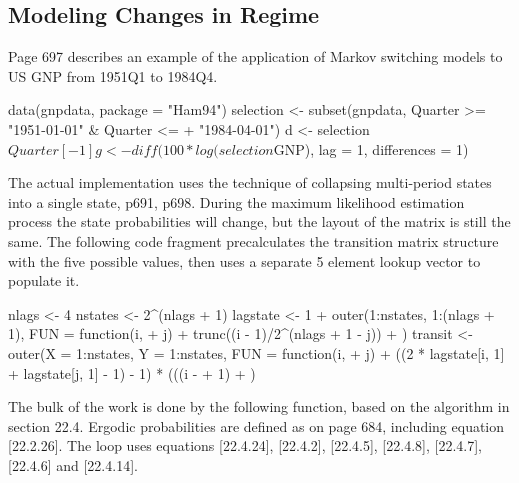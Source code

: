 \documentclass[a4paper]{article}
\renewcommand{\~}{\perispomeni}%
\begin{document}
\subsection{Modeling Changes in Regime}
Page 697 describes an example of the application of Markov switching models to US GNP from 1951Q1 to 1984Q4.
\begin{Schunk}
\begin{Sinput}
 data(gnpdata, package = "Ham94")
 selection <- subset(gnpdata, Quarter >= "1951-01-01" & Quarter <= 
+     "1984-04-01")
 d <- selection$Quarter[-1]
 g <- diff(100 * log(selection$GNP), lag = 1, differences = 1)
\end{Sinput}
\end{Schunk}

The actual implementation uses the technique of collapsing multi-period states into a single state, p691, p698.
During the maximum likelihood estimation process the state probabilities will change, but the layout of the matrix
is still the same.  The following code fragment precalculates the transition matrix structure with the five possible
values, then uses a separate 5 element lookup vector to populate it.
\begin{Schunk}
\begin{Sinput}
 nlags <- 4
 nstates <- 2^(nlags + 1)
 lagstate <- 1 + outer(1:nstates, 1:(nlags + 1), FUN = function(i, 
+     j) {
+     trunc((i - 1)/2^(nlags + 1 - j))%
+ })
 transit <- outer(X = 1:nstates, Y = 1:nstates, FUN = function(i, 
+     j) {
+     ((2 * lagstate[i, 1] + lagstate[j, 1] - 1) - 1) * (((i - 
+         1)%
+ })
\end{Sinput}
\end{Schunk}
The bulk of the work is done by the following function, based on the algorithm in section 22.4.
Ergodic probabilities are defined as on page 684, including equation [22.2.26].
The loop uses equations [22.4.24], [22.4.2], [22.4.5], [22.4.8], [22.4.7], [22.4.6] and [22.4.14].
\end{document}
